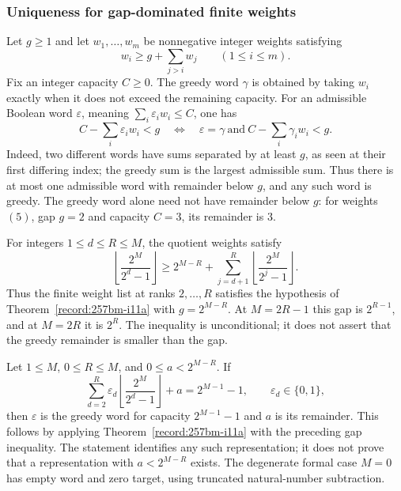 \subsubsection*{Uniqueness for gap-dominated finite weights}

\begin{thm}\label{record:257bm-i11a}
Let $g\ge1$ and let $w_1,\ldots,w_m$ be nonnegative integer weights
satisfying
\[
 w_i\ge g+\sum_{j>i}w_j\qquad(1\le i\le m).
\]
Fix an integer capacity $C\ge0$. The greedy word $\gamma$ is obtained
by taking $w_i$ exactly when it does not exceed the remaining capacity.
For an admissible Boolean word $\varepsilon$, meaning
$\sum_i\varepsilon_iw_i\le C$, one has
\[
 C-\sum_i\varepsilon_iw_i<g
 \quad\Longleftrightarrow\quad
 \varepsilon=\gamma\ \text{and}\
 C-\sum_i\gamma_iw_i<g.
\]
Indeed, two different words have sums separated by at least $g$, as
seen at their first differing index; the greedy sum is the largest
admissible sum. Thus there is at most one admissible word with remainder
below $g$, and any such word is greedy. The greedy word alone need not
have remainder below $g$: for weights $(5)$, gap $g=2$ and capacity
$C=3$, its remainder is $3$.
\end{thm}

\begin{prop}\label{record:257bm-i11b}
For integers $1\le d\le R\le M$, the quotient weights satisfy
\[
 \left\lfloor\frac{2^M}{2^d-1}\right\rfloor
 \ge 2^{M-R}+
 \sum_{j=d+1}^{R}\left\lfloor\frac{2^M}{2^j-1}\right\rfloor.
\]
Thus the finite weight list at ranks $2,\ldots,R$ satisfies the
hypothesis of Theorem~\ref{record:257bm-i11a} with $g=2^{M-R}$.
At $M=2R-1$ this gap is $2^{R-1}$, and at $M=2R$ it is $2^R$.
The inequality is unconditional; it does not assert that the greedy
remainder is smaller than the gap.
\end{prop}

\begin{prop}\label{record:257bm-i11c}
Let $1\le M$, $0\le R\le M$, and $0\le a<2^{M-R}$. If
\[
 \sum_{d=2}^{R}\varepsilon_d
       \left\lfloor\frac{2^M}{2^d-1}\right\rfloor+a
       =2^{M-1}-1,\qquad \varepsilon_d\in\{0,1\},
\]
then $\varepsilon$ is the greedy word for capacity $2^{M-1}-1$
and $a$ is its remainder. This follows by applying
Theorem~\ref{record:257bm-i11a} with the preceding gap inequality.
The statement identifies any such representation; it does not prove
that a representation with $a<2^{M-R}$ exists. The degenerate formal
case $M=0$ has empty word and zero target, using truncated natural-number
subtraction.
\end{prop}

